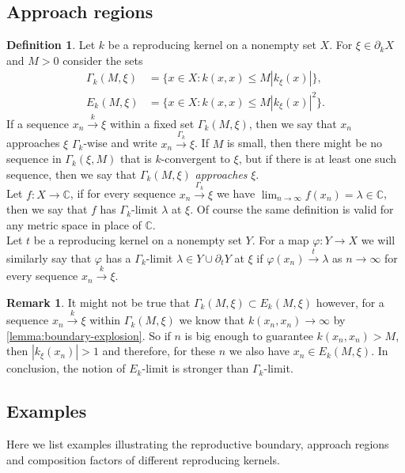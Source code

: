 \documentclass[leqno, final]{article}
\theoremstyle{definition}
\newtheorem{definition}{Definition}
\newtheorem{remark}{Remark}
\newcommand{\xto}[1]{\stackrel{#1}{\to}}
\newcommand{\plane}{\mathbb{C}}
\newcommand{\rand}{\partial}
\renewcommand{\phi}{\varphi}
\begin{document}
\subsection{Approach regions}
\begin{definition}
Let $k$ be a reproducing kernel on a nonempty set $X$.
For $\xi\in\rand_k X$ and $M>0$ consider the sets \begin{align}
	\Gamma_k(M,\xi) &= \{x\in X: k(x,x)\leq M|k_\xi(x)|\}, \\
	E_k(M,\xi)      &= \{x\in X: k(x,x)\leq M|k_\xi(x)|^2\}.
\end{align}
If a sequence $x_n\xto{k}\xi$ within a fixed set $\Gamma_k(M,\xi)$, then we say that
$x_n$ approaches $\xi$ $\Gamma_k$-wise and write $x_n\xto{\Gamma_k}\xi$. If $M$ is
small, then there might be no sequence in $\Gamma_k(\xi,M)$ that is $k$-convergent to $\xi$,
but if there is at least one such sequence, then we say that $\Gamma_k(M,\xi)$
\emph{approaches} $\xi$.
\\ Let $f:X\to\plane$, if for every sequence $x_n\xto{\Gamma_k}\xi$ we have
$\lim_{n\to\infty}f(x_n)=\lambda\in\plane$, then we say that $f$ has $\Gamma_k$-limit $\lambda$
at $\xi$. Of course the same definition is valid for any metric space in place of $\plane$.
\\ Let $t$ be a reproducing kernel on a nonempty set $Y$. For a map $\phi:Y\to X$ we will
similarly say that $\phi$ has a $\Gamma_k$-limit $\lambda\in Y\cup\rand_t Y$ at $\xi$ if
$\phi(x_n)\xto{t}\lambda$ as $n\to\infty$ for every sequence $x_n\xto{k}\xi$.
\end{definition}
\begin{remark}
It might not be true that $\Gamma_k(M,\xi)\subset E_k(M,\xi)$ however, for a
sequence $x_n\xto{k}\xi$ within $\Gamma_k(M,\xi)$ we know that
$k(x_n,x_n)\to\infty$ by \cref{lemma:boundary-explosion}. So  if $n$ is big enough to guarantee $k(x_n,x_n)>M$,
then $|k_\xi(x_n)|>1$ and therefore, for these $n$ we also have
$x_n\in E_k(M,\xi)$. In conclusion, the notion of $E_k$-limit is stronger
than $\Gamma_k$-limit.
\end{remark}


\subsection{Examples}
Here we list examples illustrating the reproductive boundary, approach regions and composition
factors of different reproducing kernels.
\end{document}
